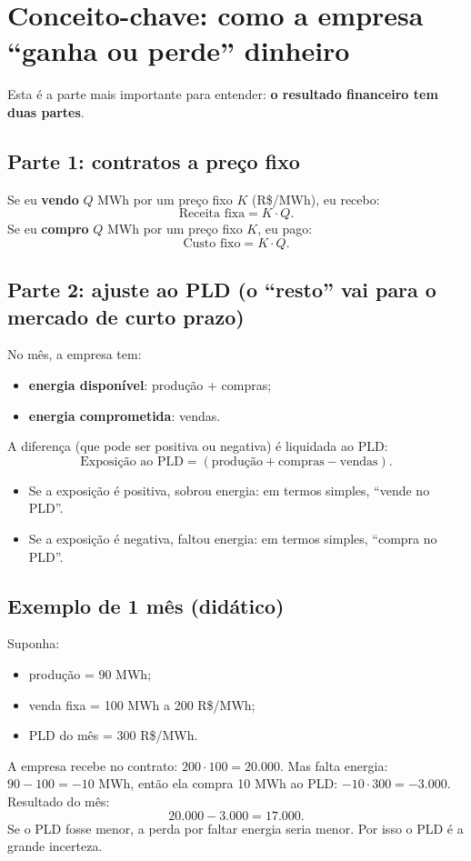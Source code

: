 \documentclass{article}
\begin{document}
\section{Conceito-chave: como a empresa ``ganha ou perde'' dinheiro}

Esta é a parte mais importante para entender: \textbf{o resultado financeiro tem duas partes}.

\subsection{Parte 1: contratos a preço fixo}
Se eu \textbf{vendo} $Q$ MWh por um preço fixo $K$ (R\$/MWh), eu recebo:
\[
\text{Receita fixa} = K \cdot Q.
\]
Se eu \textbf{compro} $Q$ MWh por um preço fixo $K$, eu pago:
\[
\text{Custo fixo} = K \cdot Q.
\]

\subsection{Parte 2: ajuste ao PLD (o ``resto'' vai para o mercado de curto prazo)}
No mês, a empresa tem:
\begin{itemize}
    \item \textbf{energia disponível}: produção + compras;
    \item \textbf{energia comprometida}: vendas.
\end{itemize}
A diferença (que pode ser positiva ou negativa) é liquidada ao PLD:
\[
\text{Exposição ao PLD} = (\text{produção} + \text{compras} - \text{vendas}).
\]
\begin{itemize}
    \item Se a exposição é positiva, sobrou energia: em termos simples, ``vende no PLD''.
    \item Se a exposição é negativa, faltou energia: em termos simples, ``compra no PLD''.
\end{itemize}

\subsection{Exemplo de 1 mês (didático)}
Suponha:
\begin{itemize}
    \item produção = 90 MWh;
    \item venda fixa = 100 MWh a 200 R\$/MWh;
    \item PLD do mês = 300 R\$/MWh.
\end{itemize}
A empresa recebe no contrato: $200 \cdot 100 = 20.000$.
Mas falta energia: $90 - 100 = -10$ MWh, então ela compra 10 MWh ao PLD:
$-10 \cdot 300 = -3.000$.
Resultado do mês:
\[
20.000 - 3.000 = 17.000.
\]
Se o PLD fosse menor, a perda por faltar energia seria menor. Por isso o PLD é a grande incerteza.
\end{document}
